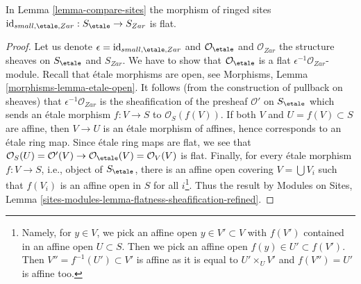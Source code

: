 \begin{lemma}
\label{lemma-compare-etale-zariski-flat}
In Lemma \ref{lemma-compare-sites} the morphism of ringed
sites $\text{id}_{small, \etale, Zar} : S_\etale \to S_{Zar}$ is flat.
\end{lemma}

\begin{proof}
Let us denote $\epsilon = \text{id}_{small, \etale, Zar}$ and
$\mathcal{O}_\etale$ and $\mathcal{O}_{Zar}$ the structure
sheaves on $S_\etale$ and $S_{Zar}$. We have to show that
$\mathcal{O}_\etale$ is a flat $\epsilon^{-1}\mathcal{O}_{Zar}$-module.
Recall that \'etale morphisms are open, see
Morphisms, Lemma \ref{morphisms-lemma-etale-open}.
It follows (from the construction of pullback on sheaves)
that $\epsilon^{-1}\mathcal{O}_{Zar}$ is the sheafification
of the presheaf $\mathcal{O}'$ on $S_\etale$
which sends an \'etale morphism $f : V \to S$ to $\mathcal{O}_S(f(V))$.
If both $V$ and $U = f(V) \subset S$ are affine,
then $V \to U$ is an \'etale morphism of affines,
hence corresponds to an \'etale ring map.
Since \'etale ring maps are flat, we see that
$\mathcal{O}_S(U) = \mathcal{O}'(V) \to
\mathcal{O}_\etale(V) = \mathcal{O}_V(V)$ is flat.
Finally, for every \'etale morphism $f : V \to S$, i.e., object of
$S_\etale$, there is an affine open covering $V = \bigcup V_i$
such that $f(V_i)$ is an affine open in
$S$ for all $i$\footnote{Namely, for $y \in V$, we pick an affine open
$y \in V' \subset V$ with $f(V')$ contained in an affine
open $U \subset S$. Then we pick an affine open $f(y) \in U' \subset f(V')$.
Then $V'' = f^{-1}(U') \subset V'$ is affine as it is equal
to $U' \times_U V'$ and $f(V'') = U'$ is affine too.}.
Thus the result by Modules on Sites, Lemma
\ref{sites-modules-lemma-flatness-sheafification-refined}.
\end{proof}

